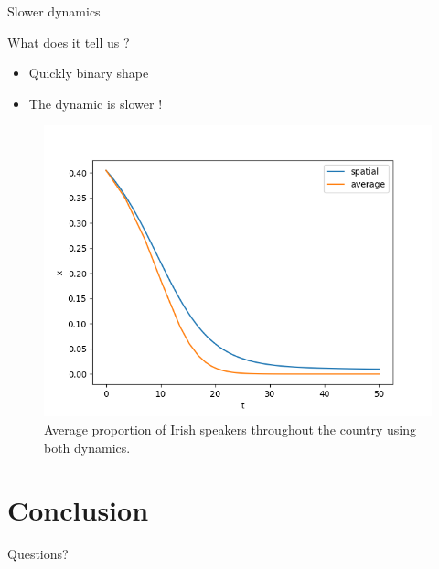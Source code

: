 \documentclass[10pt]{beamer}
\begin{document}
\begin{frame}{Slower dynamics}
\begin{alertblock}{What does it tell us ?}
\begin{itemize}
\item Quickly binary shape
\item The dynamic is slower !
\end{itemize}

\begin{figure}[H]
\centering
\includegraphics[scale=0.37]{overall_dyn_ir.png}
\caption{Average proportion of Irish speakers throughout the country using both dynamics.}
\label{fig:overall}
\end{figure}

\end{alertblock}
\end{frame}

\section{Conclusion}

\begin{frame}[standout]
    Questions?
\end{frame}
\end{document}
